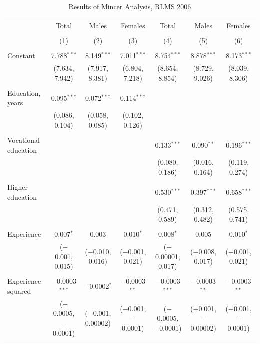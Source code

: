 \documentclass[12pt,a4paper]{article}
\numberwithin{equation}{section}
\begin{document}
\begin{landscape}
	
	\fontsize{9}{11}
	\selectfont
	
	\begin{table}[!htbp] \centering 
		\caption{Results of Mincer Analysis, RLMS 2006} 
		\label{} 
		\begin{tabular}{@{\extracolsep{5pt}}lcccccc} 
			\\[-1.8ex]\hline 
			\hline \\[-1.8ex] 
			& Total & Males & Females & Total & Males & Females \\ 
			\\[-1.8ex] & (1) & (2) & (3) & (4) & (5) & (6)\\ 
			\hline \\[-1.8ex] 
			Constant & 7.788$^{***}$ & 8.149$^{***}$ & 7.011$^{***}$ & 8.754$^{***}$ & 8.878$^{***}$ & 8.173$^{***}$ \\ 
			& (7.634, 7.942) & (7.917, 8.381) & (6.804, 7.218) & (8.654, 8.854) & (8.729, 9.026) & (8.039, 8.306) \\ 
			& & & & & & \\ 
			Education, years & 0.095$^{***}$ & 0.072$^{***}$ & 0.114$^{***}$ &  &  &  \\ 
			& (0.086, 0.104) & (0.058, 0.085) & (0.102, 0.126) &  &  &  \\ 
			& & & & & & \\ 
			Vocational education &  &  &  & 0.133$^{***}$ & 0.090$^{**}$ & 0.196$^{***}$ \\ 
			&  &  &  & (0.080, 0.186) & (0.016, 0.164) & (0.119, 0.274) \\ 
			& & & & & & \\ 
			Higher education &  &  &  & 0.530$^{***}$ & 0.397$^{***}$ & 0.658$^{***}$ \\ 
			&  &  &  & (0.471, 0.589) & (0.312, 0.482) & (0.575, 0.741) \\ 
			& & & & & & \\ 
			Experience & 0.007$^{*}$ & 0.003 & 0.010$^{*}$ & 0.008$^{*}$ & 0.005 & 0.010$^{*}$ \\ 
			& ($-$0.001, 0.015) & ($-$0.010, 0.016) & ($-$0.001, 0.021) & ($-$0.00001, 0.017) & ($-$0.008, 0.017) & ($-$0.001, 0.021) \\ 
			& & & & & & \\ 
			Experience squared & $-$0.0003$^{***}$ & $-$0.0002$^{*}$ & $-$0.0003$^{**}$ & $-$0.0003$^{***}$ & $-$0.0003$^{**}$ & $-$0.0003$^{**}$ \\ 
			& ($-$0.0005, $-$0.0001) & ($-$0.001, 0.00002) & ($-$0.001, $-$0.0001) & ($-$0.0005, $-$0.0001) & ($-$0.001, $-$0.00002) & ($-$0.001, $-$0.0001) \\ 

\end{tabular}
\end{table}
\end{landscape}
\end{document}
